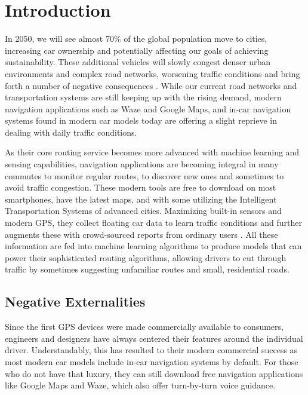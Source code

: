 \chapter{Introduction}
\label{introduction}
In 2050, we will see almost 70\% of the global population move to cities, increasing car ownership and potentially affecting our goals of achieving sustainability. These additional vehicles will slowly congest denser urban environments and complex road networks, worsening traffic conditions and bring forth a number of negative consequences \cite{Mehndiratta2017}. While our current road networks and transportation systems are still keeping up with the rising demand, modern navigation applications such as Waze and Google Maps, and in-car navigation systems found in modern car models today are offering a slight reprieve in dealing with daily traffic conditions. 

As their core routing service becomes more advanced with machine learning and sensing capabilities, navigation applications are becoming integral in many commutes to monitor regular routes, to discover new ones and sometimes to avoid traffic congestion. These modern tools are free to download on most smartphones, have the latest maps, and with some utilizing the Intelligent Transportation Systems of advanced cities. Maximizing built-in sensors and modern GPS, they collect floating car data to learn traffic conditions and further augments these with crowd-sourced reports from ordinary users \cite{Levine2014SystemExchange, Valdes-Dapena2016MostDirections}. All these information are fed into machine learning algorithms to produce models that can power their sophisticated routing algorithms, allowing drivers to cut through traffic by sometimes suggesting unfamiliar routes and small, residential roads. 

\section{Negative Externalities}
Since the first GPS devices were made commercially available to consumers, engineers and designers have always centered their features around the individual driver. Understandably, this has resulted to their modern commercial success as most modern car models include in-car navigation systems by default. For those who do not have that luxury, they can still download free navigation applications like Google Maps and Waze, which also offer turn-by-turn voice guidance. 

